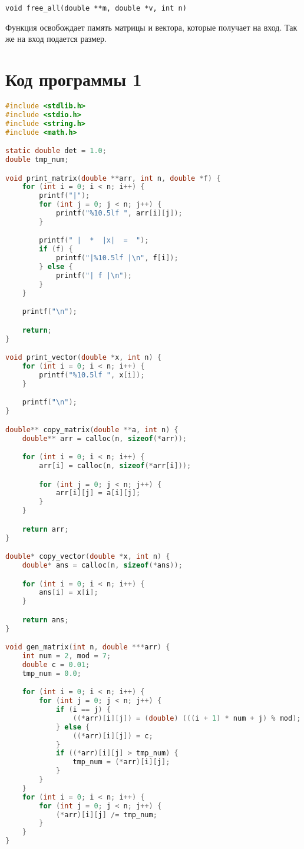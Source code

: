 \documentclass[a4paper,12pt,titlepage,finall]{article}
\begin{document}
\begin{verbatim}
void free_all(double **m, double *v, int n)
\end{verbatim}

Функция освобождает память матрицы и вектора, которые получает на вход. Так же на вход подается размер.

\newpage
\section{Код программы 1}
\begin{lstlisting}[language=C, caption=main.c]
#include <stdlib.h>
#include <stdio.h>
#include <string.h>
#include <math.h>

static double det = 1.0;
double tmp_num;

void print_matrix(double **arr, int n, double *f) {
    for (int i = 0; i < n; i++) {
        printf("|");
        for (int j = 0; j < n; j++) {
            printf("%10.5lf ", arr[i][j]);
        }

        printf(" |  *  |x|  =  ");
        if (f) {
            printf("|%10.5lf |\n", f[i]);
        } else {
            printf("| f |\n");
        }
    }

    printf("\n");

    return;
}

void print_vector(double *x, int n) {
    for (int i = 0; i < n; i++) {
        printf("%10.5lf ", x[i]);
    }

    printf("\n");
}

double** copy_matrix(double **a, int n) {
    double** arr = calloc(n, sizeof(*arr));

    for (int i = 0; i < n; i++) {
        arr[i] = calloc(n, sizeof(*arr[i]));

        for (int j = 0; j < n; j++) {
            arr[i][j] = a[i][j];
        }
    }

    return arr;
}

double* copy_vector(double *x, int n) {
    double* ans = calloc(n, sizeof(*ans));

    for (int i = 0; i < n; i++) {
        ans[i] = x[i];
    }

    return ans;
}

void gen_matrix(int n, double ***arr) {
    int num = 2, mod = 7;
    double c = 0.01;
    tmp_num = 0.0;

    for (int i = 0; i < n; i++) {
        for (int j = 0; j < n; j++) {
            if (i == j) {
                ((*arr)[i][j]) = (double) (((i + 1) * num + j) % mod);
            } else {
                ((*arr)[i][j]) = c;
            }
            if ((*arr)[i][j] > tmp_num) {
                tmp_num = (*arr)[i][j];
            }
        }
    }
    for (int i = 0; i < n; i++) {
        for (int j = 0; j < n; j++) {
            (*arr)[i][j] /= tmp_num;
        }
    }
}


\end{lstlisting}
\end{document}
